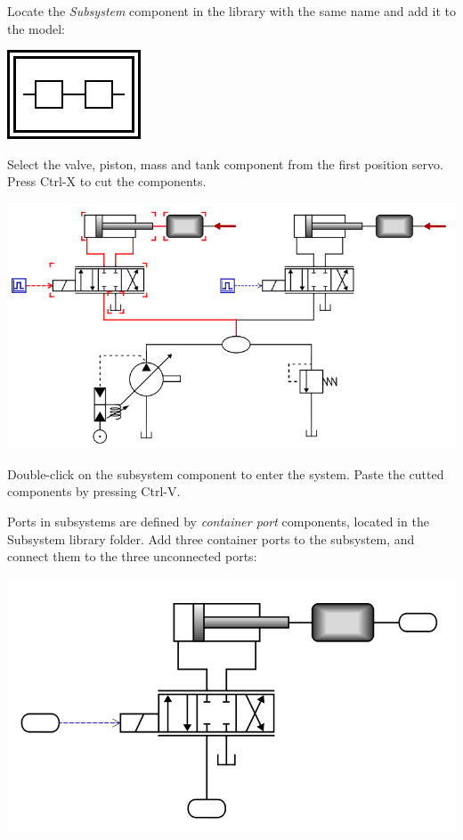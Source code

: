\documentclass[a4paper,pdftex]{article}
\begin{document}
\begin{enumerate}
Locate the \textit{Subsystem} component in the library with the same name and add it to the model:

\vspace{5pt}
\includegraphics{gfx/advancedusage/subsystem.pdf}

Select the valve, piston, mass and tank component from the first position servo. Press Ctrl-X to cut the components.

\includegraphics[width=0.85\linewidth]{gfx/advancedusage/componentsforsubsystem.png}

Double-click on the subsystem component to enter the system. Paste the cutted components by pressing Ctrl-V.

Ports in subsystems are defined by \textit{container port} components, located in the Subsystem library folder. Add three container ports to the subsystem, and connect them to the three unconnected ports:

\includegraphics[width=0.6\linewidth]{gfx/advancedusage/systemports.png}


\end{enumerate}
\end{document}

